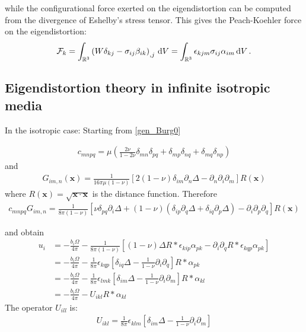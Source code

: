 while  the configurational force exerted on
the eigendistortion can be computed from the  divergence of  Eshelby's stress
tensor. This  gives the 
Peach-Koehler force on the eigendistortion:
\begin{align}
\mathcal{F}_k=\int_{\mathbb{R}^3}\left(W\delta_{kj}-\sigma_{ij}\beta_{ik}\right)_{,j}\, \text{d}V=\int_{\mathbb{R}^3}\epsilon_{kjm}\sigma_{ij}\alpha_{im}\, \text{d}V\,.
\label{EshelbyStress_classical}
\end{align}

\subsection{Eigendistortion theory in infinite isotropic media}
In the isotropic case:
Starting from \eqref{gen_Burg0}


\begin{align}
c_{mnpq}=\mu\left(\frac{2\nu}{1-2\nu}\delta_{mn}\delta_{pq}+\delta_{mp}\delta_{nq}+\delta_{mq}\delta_{np}\right)
\end{align}
and
\begin{align}
G_{im,n}(\bm x)=\frac{1}{16\pi \mu(1-\nu)}\left[2(1-\nu)\delta_{im}\partial_n\Delta-\partial_n\partial_i\partial_m\right]R(\bm x)
\end{align}
where $R(\bm x)=\sqrt{\bm x\cdot\bm x}$ is the distance function.
Therefore
\begin{align}
c_{mnpq}G_{im,n}=\frac{1}{8\pi(1-\nu)}\left[\nu\delta_{pq}\partial_i\Delta+(1-\nu)\left(\delta_{ip}\partial_q\Delta+\delta_{iq}\partial_p\Delta\right)-\partial_i\partial_p\partial_q\right]R(\bm x)
\end{align}

and obtain
\begin{align}
u_i&=-\frac{b_i\Omega}{4\pi}-\frac{1}{8\pi(1-\nu)}\left[(1-\nu)  \Delta R * \epsilon_{kip}\alpha_{pk} - \partial_i\partial_q R * \epsilon_{kqp}\alpha_{pk}\right]\nonumber\\
&=-\frac{b_i\Omega}{4\pi}-\frac{1}{8\pi}\epsilon_{kqp}\left[ \delta_{iq}\Delta  -\frac{1}{1-\nu} \partial_i\partial_q  \right] R * \alpha_{pk}\nonumber\\
&=-\frac{b_i\Omega}{4\pi}-\frac{1}{8\pi}\epsilon_{lmk}\left[ \delta_{im}\Delta  -\frac{1}{1-\nu} \partial_i\partial_m  \right] R * \alpha_{kl}\nonumber\\
&=-\frac{b_i\Omega}{4\pi}-U_{ikl} R * \alpha_{kl}
\end{align}
The operator $U_{ill}$ is:
\begin{align}
U_{ikl}=\frac{1}{8\pi}\epsilon_{klm}\left[ \delta_{im}\Delta  -\frac{1}{1-\nu} \partial_i\partial_m  \right]
\end{align}

